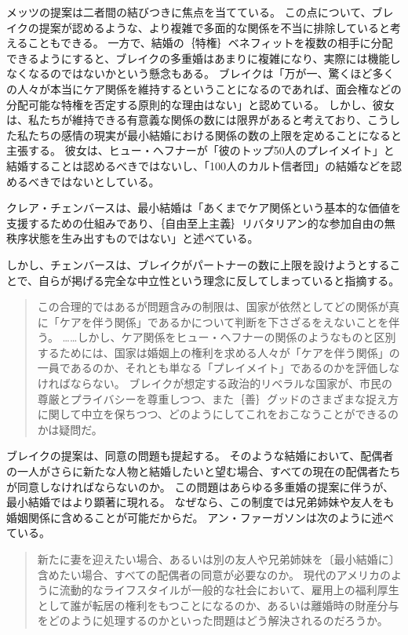 \documentclass[paper=a4,book,openany]{jlreq}
\newcommand{\ig}[1]{}           %
\begin{document}
メッツの提案は二者間の結びつきに焦点を当てている。
この点について、ブレイクの提案が認めるような、より複雑で多面的な関係を不当に排除していると考えることもできる。
一方で、結婚の｛特権｝{ベネフィット}を複数の相手に分配できるようにすると、ブレイクの多重婚はあまりに複雑になり、実際には機能しなくなるのではないかという懸念もある。
ブレイクは「万が一、驚くほど多くの人々が本当にケア関係を維持するということになるのであれば、面会権などの分配可能な特権を否定する原則的な理由はない」と認めている\citep[p.140]{brake12:_minim_marriag}。
しかし、彼女は、私たちが維持できる有意義な関係の数には限界があると考えており、こうした私たちの感情の現実が最小結婚における関係の数の上限を定めることになると主張する。
彼女は、ヒュー・ヘフナーが「彼のトップ50人のプレイメイト」と結婚することは認めるべきではないし、「100人のカルト信者団」の結婚などを認めるべきではないとしている\citep[p.164]{brake12:_minim_marriag}。

クレア・チェンバースは、最小結婚は「あくまでケア関係という基本的な価値を支援するための仕組みであり、｛自由至上主義｝{リバタリアン}的な参加自由の無秩序状態を生み出すものではない」と述べている\citep[p.96]{chambers17:againstmarriage}。
\ig{Clare chmbers}
しかし、チェンバースは、ブレイクがパートナーの数に上限を設けようとすることで、自らが掲げる完全な中立性という理念に反してしまっていると指摘する。

\begin{quote}
この合理的ではあるが問題含みの制限は、国家が依然としてどの関係が真に「ケアを伴う関係」であるかについて判断を下さざるをえないことを伴う。
……しかし、ケア関係をヒュー・ヘフナーの関係のようなものと区別するためには、国家は婚姻上の権利を求める人々が「ケアを伴う関係」の一員であるのか、それとも単なる「プレイメイト」であるのかを評価しなければならない。
ブレイクが想定する政治的リベラルな国家が、市民の尊厳とプライバシーを尊重しつつ、また｛善｝{グッド}のさまざまな捉え方に関して中立を保ちつつ、どのようにしてこれをおこなうことができるのかは疑問だ。
\citep[p.96]{chambers17:againstmarriage}\ig{Clare chmbers}
\end{quote}

ブレイクの提案は、同意の問題も提起する。
そのような結婚において、配偶者の一人がさらに新たな人物と結婚したいと望む場合、すべての現在の配偶者たちが同意しなければならないのか。
この問題はあらゆる多重婚の提案に伴うが、最小結婚ではより顕著に現れる。
なぜなら、この制度では兄弟姉妹や友人をも婚姻関係に含めることが可能だからだ。
アン・ファーガソンは次のように述べている。

\begin{quote}
新たに妻を迎えたい場合、あるいは別の友人や兄弟姉妹を〔最小結婚に〕含めたい場合、すべての配偶者の同意が必要なのか。
現代のアメリカのように流動的なライフスタイルが一般的な社会において、雇用上の福利厚生として誰が転居の権利をもつことになるのか、あるいは離婚時の財産分与をどのように処理するのかといった問題はどう解決されるのだろうか。
\citep{ferguson14:_review_brake}
\end{quote}
\end{document}
